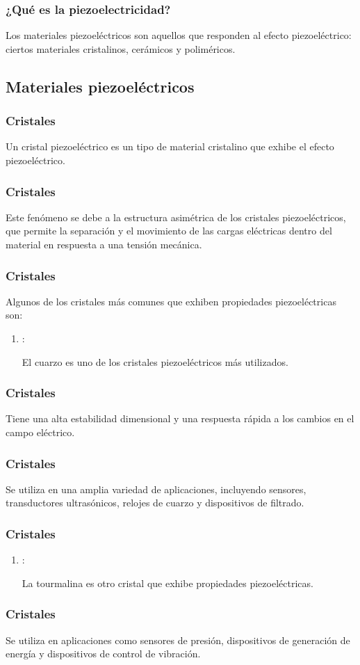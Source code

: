 \documentclass[14pt]{beamer}
\begin{document}
\begin{frame}
\frametitle{¿Qué es la piezoelectricidad?}
Los materiales piezoeléctricos son aquellos que responden al efecto piezoeléctrico: \pause ciertos materiales cristalinos, cerámicos y poliméricos.
\end{frame}

\subsection{Materiales piezoeléctricos}

\begin{frame}
\frametitle{Cristales}
Un cristal piezoeléctrico es un tipo de material cristalino que exhibe el efecto piezoeléctrico.
\end{frame}
\begin{frame}
\frametitle{Cristales}
Este fenómeno se debe a la estructura asimétrica de los cristales piezoeléctricos, \pause que permite la separación y el movimiento de las cargas eléctricas dentro del material en respuesta a una tensión mecánica.
\end{frame}
\begin{frame}
\frametitle{Cristales}
Algunos de los cristales más comunes que exhiben propiedades piezoeléctricas son:
\begin{enumerate}[<+->]
\item {}:

El cuarzo es uno de los cristales piezoeléctricos más utilizados.
\seti
\end{enumerate}
\end{frame}
\begin{frame}
\frametitle{Cristales}
Tiene una alta estabilidad dimensional y una respuesta rápida a los cambios en el campo eléctrico.
\end{frame}
\begin{frame}
\frametitle{Cristales}
Se utiliza en una amplia variedad de aplicaciones, incluyendo sensores, transductores ultrasónicos, relojes de cuarzo y dispositivos de filtrado.
\end{frame}
\begin{frame}
\frametitle{Cristales}
\begin{enumerate}[<+->]
\item {}:

La tourmalina es otro cristal que exhibe propiedades piezoeléctricas.
\end{enumerate}
\end{frame}
\begin{frame}
\frametitle{Cristales}    
Se utiliza en aplicaciones como sensores de presión, dispositivos de generación de energía y dispositivos de control de vibración.
\end{frame}
\end{document}
